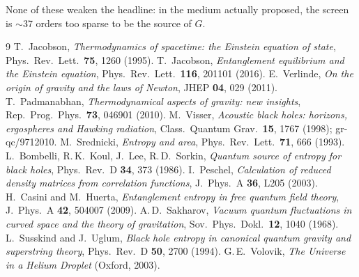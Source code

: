 \documentclass[11pt]{article}
\begin{document}
\noindent None of these weaken the headline: in the medium actually proposed, the
screen is $\sim$37 orders too sparse to be the source of $G$.

\begin{thebibliography}{9}
 T.\ Jacobson, \emph{Thermodynamics of spacetime: the Einstein
  equation of state}, Phys.\ Rev.\ Lett.\ \textbf{75}, 1260 (1995).
 T.\ Jacobson, \emph{Entanglement equilibrium and the
  Einstein equation}, Phys.\ Rev.\ Lett.\ \textbf{116}, 201101 (2016).
 E.\ Verlinde, \emph{On the origin of gravity and the laws of
  Newton}, JHEP \textbf{04}, 029 (2011).
 T.\ Padmanabhan, \emph{Thermodynamical aspects of gravity:
  new insights}, Rep.\ Prog.\ Phys.\ \textbf{73}, 046901 (2010).
 M.\ Visser, \emph{Acoustic black holes: horizons, ergospheres
  and Hawking radiation}, Class.\ Quantum Grav.\ \textbf{15}, 1767 (1998);
  gr-qc/9712010.
 M.\ Srednicki, \emph{Entropy and area}, Phys.\ Rev.\ Lett.\
  \textbf{71}, 666 (1993).
 L.\ Bombelli, R.\,K.\ Koul, J.\ Lee, R.\,D.\ Sorkin,
  \emph{Quantum source of entropy for black holes}, Phys.\ Rev.\ D \textbf{34},
  373 (1986).
 I.\ Peschel, \emph{Calculation of reduced density matrices from
  correlation functions}, J.\ Phys.\ A \textbf{36}, L205 (2003).
\bibitem{casinihuerta} H.\ Casini and M.\ Huerta, \emph{Entanglement entropy in
  free quantum field theory}, J.\ Phys.\ A \textbf{42}, 504007 (2009).
\bibitem{sakharov} A.\,D.\ Sakharov, \emph{Vacuum quantum fluctuations in curved
  space and the theory of gravitation}, Sov.\ Phys.\ Dokl.\ \textbf{12}, 1040
  (1968).
 L.\ Susskind and J.\ Uglum, \emph{Black hole entropy in
  canonical quantum gravity and superstring theory}, Phys.\ Rev.\ D \textbf{50},
  2700 (1994).
 G.\,E.\ Volovik, \emph{The Universe in a Helium Droplet}
  (Oxford, 2003).
\end{thebibliography}
\end{document}
